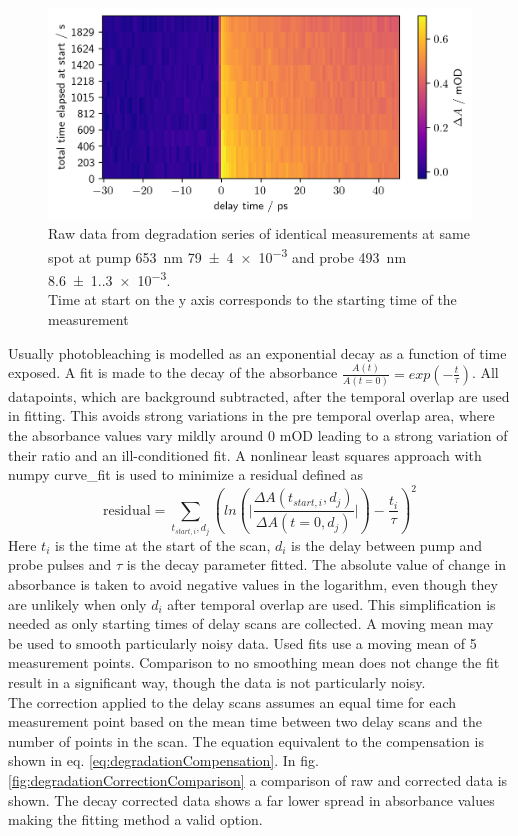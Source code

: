 \documentclass[twoside,openright]{scrreprt}
\begin{document}
\begin{figure}[hbtp]
\centering
\includegraphics[width=\linewidth]{images/DegradationRAWPump653Probe493.png}
\caption{Raw data from degradation series of identical measurements at same spot at pump \SI{653}{\nano\meter} \SI{79(4)e-3}{\radExp} and probe \SI{493}{\nano\meter} \SI{8.6(1.3)e-3}{\radExp}.\\
Time at start on the y axis corresponds to the starting time of the measurement\label{fig:rawDegradation}}
\end{figure}
Usually photobleaching is modelled as an exponential decay as a function of time exposed. A fit is made to the decay of the absorbance $\frac{A\left(t\right)}{A\left(t=0\right)} = exp(-\frac{t}{\tau})$.
All datapoints, which are background subtracted, after the temporal overlap are used in fitting. This avoids strong variations in the pre temporal overlap area, where the absorbance values vary mildly around 0 mOD leading to a strong variation of their ratio and an ill-conditioned fit. A nonlinear least squares approach with numpy curve\_fit is used to minimize a residual defined as
\begin{equation}
\mathrm{residual} = \sum_{t_{start,i},d_j} \left(ln\left(\lvert\frac{\Delta A(t_{start,i},d_j)}{\Delta A(t=0,d_j)}\rvert\right)- \frac{t_i}{\tau}\right)^2
\end{equation}
Here $t_i$ is the time at the start of the scan, $d_i$ is the delay between pump and probe pulses and $\tau$ is the decay parameter fitted. The absolute value of change in absorbance is taken to avoid negative values in the logarithm, even though they are unlikely when only $d_i$ after temporal overlap are used.  This simplification is needed as only starting times of delay scans are collected. A moving mean may be used to smooth particularly noisy data. Used fits use a moving mean of 5 measurement points. Comparison to no smoothing mean does not change the fit result in a significant way, though the data is not particularly noisy.\\
The correction applied to the delay scans assumes an equal time for each measurement point based on the mean time between two delay scans and the number of points in the scan. The equation equivalent to the compensation is shown in eq. \ref{eq:degradationCompensation}. In fig. \ref{fig:degradationCorrectionComparison} a comparison of raw and corrected data is shown. The decay corrected data shows a far lower spread in absorbance values making the fitting method a valid option. 
\end{document}
